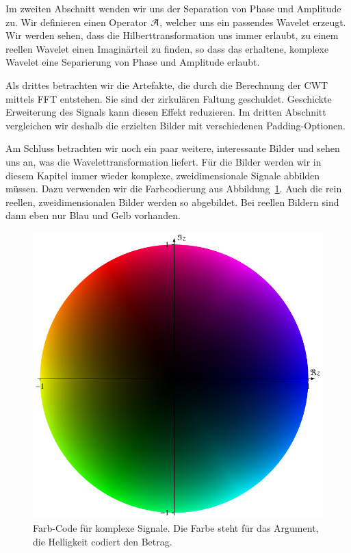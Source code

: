 \begin{refsection}
Im zweiten Abschnitt wenden wir uns der Separation von Phase und Amplitude zu.
Wir definieren einen Operator $\Ana\,$, welcher uns ein passendes Wavelet erzeugt.
Wir werden sehen, dass die Hilberttransformation uns immer erlaubt, zu einem reellen Wavelet einen Imaginärteil zu finden,
so dass das erhaltene, komplexe Wavelet eine Separierung von Phase und Amplitude erlaubt.

Als drittes betrachten wir die Artefakte, die durch die Berechnung der CWT mittels FFT entstehen.
Sie sind der zirkulären Faltung geschuldet.
Geschickte Erweiterung des Signals kann diesen Effekt reduzieren.
Im dritten Abschnitt vergleichen wir deshalb die erzielten Bilder mit verschiedenen Padding-Optionen.

Am Schluss betrachten wir noch ein paar weitere, interessante Bilder und sehen uns an, was die Wavelettransformation liefert.
Für die Bilder werden wir in diesem Kapitel immer wieder komplexe, zweidimensionale Signale abbilden müssen.
Dazu verwenden wir die Farbcodierung aus Abbildung~\ref{complex:color-code}.
Auch die rein reellen, zweidimensionalen Bilder werden so abgebildet.
Bei reellen Bildern sind dann eben nur Blau und Gelb vorhanden.

\begin{figure}
	\centering
	\includegraphics{papers/complex/images/colors.pdf}
	\caption{Farb-Code für komplexe Signale. Die Farbe steht für das Argument, die Helligkeit codiert den Betrag.}
	\label{complex:color-code}
\end{figure}


\end{refsection}
